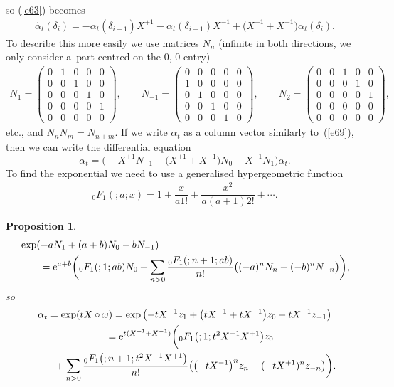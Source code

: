 \documentclass[10pt,a4paper]{amsart}
\numberwithin{equation}{section}
\newtheorem{Proposition}[Theorem]{Proposition}
 { \theoremstyle{definition}
\newtheorem{Definition}[Theorem]{Definition}
\newtheorem{Note}[Theorem]{Note}
\newtheorem{Example}[Theorem]{Example}
\newtheorem{Remark}[Theorem]{Remark} }
\newcommand{\<}{\langle}
\renewcommand{\>}{\rangle}
\begin{document}
so (\ref{e63}) becomes
\begin{gather}\label{e55}
\dot{\alpha_t}(\delta_{i})=-\alpha_t (\delta_{i+1}) X^{+1} -\alpha _t(\delta_{i-1}) X^{-1}+\big(X^{+1} +X^{-1} \big) \alpha_t (\delta_{i}).
\end{gather}
To describe this more easily we use matrices $ N_{n} $ (infinite in both directions, we only consider a~part centred on the $ 0$, $0 $ entry)
\begin{gather*}
	N_{1}=\left( \begin{matrix}
		0& 1& 0 & 0 & 0 \\
		0& 0 & 1& 0 & 0 \\
	0	& 0 & 0 &1 & 0 \\
		0& 0 & 0&0 &1 \\
		0& 0& 0& 0 & 0
	\end{matrix}
	\right), \qquad N_{-1}=\left( \begin{matrix}
		0& 0 &0 & 0& 0 \\
		1& 0 & 0 & 0 & 0\\
		0& 1 & 0 & 0& 0\\
		0& 0 & 1&0 & 0 \\
		0& 0& 0&1 & 0
	\end{matrix}
	\right), \qquad N_{2}=\left( \begin{matrix}
		0& 0 & 1& 0 & 0 \\
		0& 0 & 0 & 1& 0 \\
		0& 0& 0 & 0 & 1 \\
		0& 0& 0 &0 & 0 \\
	0	& 0& 0&0 & 0
	\end{matrix}
	\right),
\end{gather*}
etc., and $ N_{n}N_{m}=N_{n+m} $. If we write $ \alpha_t $ as a column vector similarly to~(\ref{e69}), then we can write the differential equation
\[\dot{\alpha_t}= \big({-}X^{+1} N_{-1}+\big(X^{+1}+X^{-1}\big) N_{0}-X^{-1}N_{1}\big)\alpha_t.\]
 To find the exponential we need to use a generalised hypergeometric function~\cite{web}
	\begin{gather*}
{}_{0}F_{1}(;a ;x)=1+\dfrac{x}{a 1!}+\dfrac{x^{2}}{a (a+1) 2!}+\cdots.
\end{gather*}
\begin{Proposition}\label{P2}
	\begin{gather*}
\begin{split}
&	\exp(-aN_{1}+(a+b)N_{0}-bN_{-1})\\
&\qquad{} ={\rm e}^{a+b}\bigg({}_{0}F_{1}(;1;ab)N_{0}+\sum_{n > 0}\dfrac{{}_{0}F_{1} (;n+1;ab)}{n!}\big((-a)^{n}N_{n}+(-b)^{n}N_{-n}\big)\bigg),
\end{split}
	\end{gather*}
so
	\begin{gather*}
\alpha _{t} =\exp (tX \circ \omega)	=\exp\big({-}t X^{-1}z_{1}+\big(t X^{-1}+t X^{+1}\big)z_{0}-t X^{+1}z_{-1}\big)\cr
\hphantom{\alpha _{t}}{}
={\rm e}^{t(X^{+1}+X^{-1})}\bigg({}_{0}F_{1}\big(;1;t^{2} X^{-1}X^{+1}\big)z_{0}\\
\hphantom{\alpha _{t} =}{}
+\sum_{n > 0}\dfrac{{}_{0}F_{1} \big(;n+1;t^{2} X^{-1}X^{+1}\big)}{n!}\big(\big({-}t X^{-1}\big)^{n}z_{n}+(-t X^{+1})^{n}z_{-n}\big)\bigg).
\end{gather*}
\end{Proposition}
\end{document}

